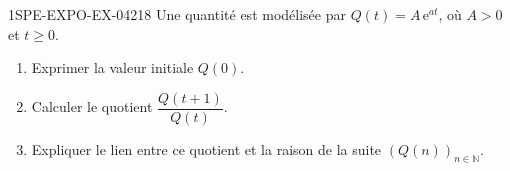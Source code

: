 \begin{exercice}{1SPE-EXPO-EX-042}{1}{8}
Une quantité est modélisée par $Q(t)=A\,\mathrm{e}^{at}$, où $A>0$ et $t\geq 0$.

\begin{enumerate}
\item Exprimer la valeur initiale $Q(0)$.
\item Calculer le quotient $\dfrac{Q(t+1)}{Q(t)}$.
\item Expliquer le lien entre ce quotient et la raison de la suite $(Q(n))_{n\in\mathbb N}$.
\end{enumerate}
\end{exercice}
